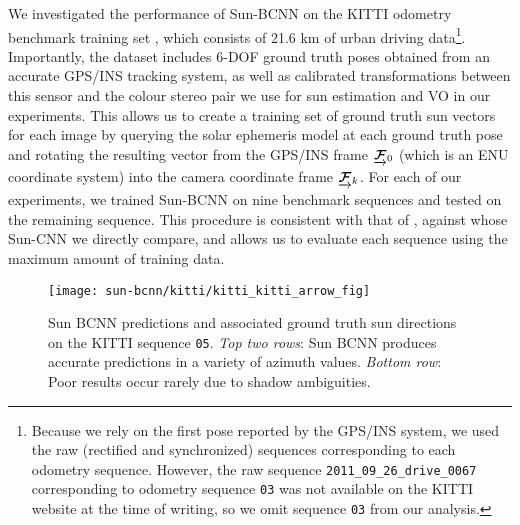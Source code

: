 We investigated the performance of Sun-BCNN on the KITTI odometry benchmark training set \citep{Geiger2013-ky}, which consists of 21.6 km of urban driving data\footnote{Because we rely on the first pose reported by the GPS/INS system, we used the raw (rectified and synchronized) sequences corresponding to each odometry sequence. However, the raw sequence \texttt{2011\_09\_26\_drive\_0067} corresponding to odometry sequence \texttt{03} was not available on the KITTI website at the time of writing, so we omit sequence \texttt{03} from our analysis.}.
Importantly, the dataset includes 6-DOF ground truth poses obtained from an accurate GPS/INS tracking system, as well as calibrated transformations between this sensor and the colour stereo pair we use for sun estimation and VO in our experiments.
This allows us to create a training set of ground truth sun vectors for each image by querying the solar ephemeris model at each ground truth pose and rotating the resulting vector from the GPS/INS frame $\underrightarrow{ \boldsymbol{\mathbf{\mathcal{F}}} }_{0}$ (which is an ENU coordinate system) into the camera coordinate frame $\underrightarrow{ \boldsymbol{\mathbf{\mathcal{F}}} }_{k}$.
For each of our experiments, we trained Sun-BCNN on nine benchmark sequences and tested on the remaining sequence.
This procedure is consistent with that of \citet{Ma2016-at}, against whose Sun-CNN we directly compare, and allows us to evaluate each sequence using the maximum amount of training data.

\begin{figure*}[h]
	\centering
	\texttt{[image: sun-bcnn/kitti/kitti\_kitti\_arrow\_fig]}	
	\caption{Sun BCNN predictions and associated ground truth sun directions on the KITTI sequence \texttt{05}. \emph{Top two rows}: Sun BCNN produces accurate predictions in a variety of azimuth values. \emph{Bottom row}: Poor results occur rarely due to shadow ambiguities.}
	\label{fig:kitti_arrows}
\end{figure*}

